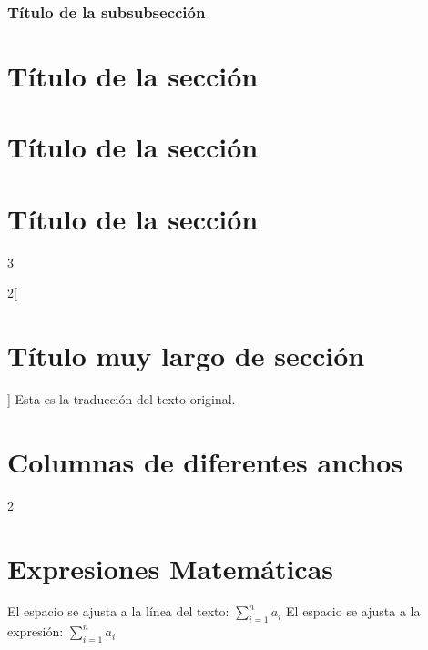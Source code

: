 \documentclass{article}     %
\begin{document}
            \subsubsection*{Título de la subsubsección}
                \lipsum[4]
    \section{Título de la sección}
        \lipsum[1]
    
    \twocolumn
    \section{Título de la sección}
        \lipsum[1-5]

    \onecolumn
    \section{Título de la sección}
        \lipsum[1]
    
    \setlength\columnsep{7.5mm}
    \begin{multicols}{3}
        \lipsum[2-3]
    \end{multicols}

    \begin{paracol}{2}[\section{Título muy largo de sección}]
        \lipsum[4]
        \switchcolumn
        Esta es la traducción del texto original.
        \switchcolumn*
        \lipsum[4]
        \switchcolumn
        \lipsum[3]
    \end{paracol}

    \section{Columnas de diferentes anchos}
    \begin{paracol}{2}
        \lipsum[1]
        \switchcolumn
        \lipsum[4]
        \textcolor{green}{\lipsum[4]}
    \end{paracol}

    \section{Expresiones Matemáticas}
    El espacio se ajusta a la línea del texto: $\sum_{i = 1}^na_i$
    El espacio se ajusta a la expresión: $\displaystyle{\sum_{i = 1}^na_i}$
\end{document}
